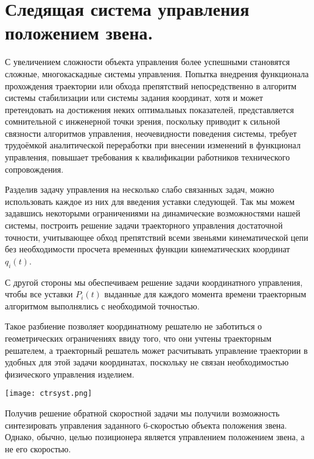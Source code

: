 \section{Следящая система управления положением звена.}

С увеличением сложности объекта управления более успешными становятся сложные, многокаскадные системы управления. Попытка внедрения функционала прохождения траектории или обхода препятствий непосредственно в алгоритм системы стабилизации или системы задания координат, хотя и может претендовать на достижения неких оптимальных показателей, представляется сомнительной с инженерной точки зрения, поскольку приводит к сильной связности алгоритмов управления, неочевидности поведения системы, требует трудоёмкой аналитической переработки при внесении изменений в функционал управления, повышает требования к квалификации работников технического сопровождения.

Разделив задачу управления на несколько слабо связанных задач, можно использовать каждое из них для введения уставки следующей. Так мы можем задавшись некоторыми ограничениями на динамические возможностями нашей системы, построить решение задачи траекторного управления достаточной точности, учитывающее обход препятствий всеми звеньями кинематической цепи без необходимости просчета временных функции кинематических координат $q_i(t)$. 

С другой стороны мы обеспечиваем решение задачи координатного управления, чтобы все уставки $P_i(t)$ выданные для каждого момента времени траекторным алгоритмом выполнялись с необходимой точностью.

Такое разбиение позволяет координатному решателю не заботиться о геометрических ограничениях ввиду того, что они учтены траекторным решателем, а траекторный решатель может расчитывать управление траектории в удобных для этой задачи координатах, поскольку не связан необходимостью физического управления изделием.   

\begin{center}
  \texttt{[image: ctrsyst.png]}
  \label{}
\end{center}

Получив решение обратной скоростной задачи мы получили возможность синтезировать управления заданного 6-скоростью объекта положения звена. Однако, обычно, целью позиционера является управлением положением звена, а не его скоростью.

